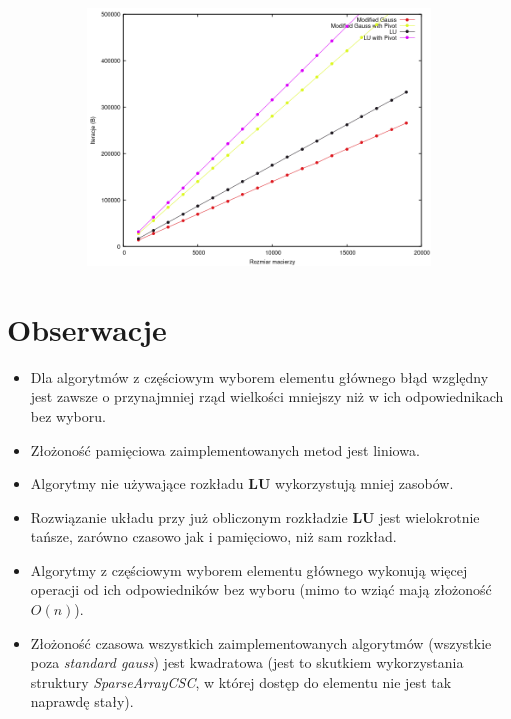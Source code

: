 \documentclass{article}
\newcommand{\mL}{\bm{L}}
\newcommand{\mU}{\bm{U}}
\begin{document}
\begin{figure}[ht]
	\centering
	\begin{subfigure}{0.8\textwidth}
		\centering
		\includegraphics[width=1.0\linewidth]{../plots/plotting_iter.png}  
	\end{subfigure}
\end{figure}
\section*{Obserwacje}
\begin{itemize}
	\item Dla algorytmów z częściowym wyborem elementu głównego błąd względny jest zawsze o przynajmniej rząd wielkości mniejszy niż w ich odpowiednikach bez wyboru.
	\item Złożoność pamięciowa zaimplementowanych metod jest liniowa.
	\item Algorytmy nie używające rozkładu $\mL\mU$ wykorzystują mniej zasobów.
	\item Rozwiązanie układu przy już obliczonym rozkładzie $\mL\mU$ jest wielokrotnie tańsze, zarówno czasowo jak i pamięciowo, niż sam rozkład.
	\item Algorytmy z częściowym wyborem elementu głównego wykonują więcej operacji od ich odpowiedników bez wyboru (mimo to wziąć mają złożoność $O(n)$).
	\item Złożoność czasowa wszystkich zaimplementowanych algorytmów (wszystkie poza \textit{standard gauss}) jest kwadratowa (jest to skutkiem wykorzystania struktury \textit{SparseArrayCSC}, w której dostęp do elementu nie jest tak naprawdę stały).
\end{itemize}
\newpage
\end{document}
